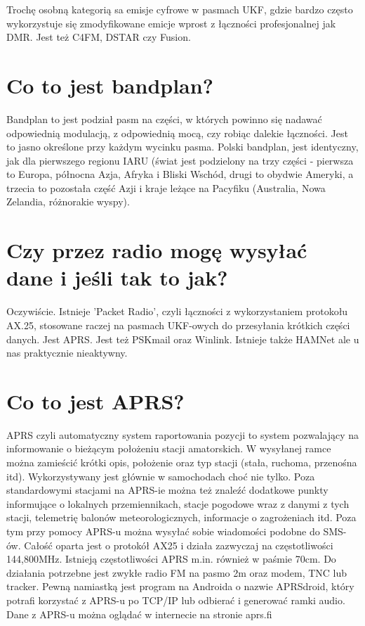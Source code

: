 \documentclass[a4paper,12pt]{article}
\begin{document}
Trochę osobną kategorią sa emisje cyfrowe w pasmach UKF, gdzie bardzo często wykorzystuje się zmodyfikowane emicje wprost z łączności profesjonalnej jak DMR. Jest też C4FM, DSTAR czy Fusion.

\section{Co to jest bandplan?}
Bandplan to jest podział pasm na części, w których powinno się nadawać odpowiednią modulacją, z odpowiednią mocą, czy robiąc dalekie łączności. Jest to jasno określone przy każdym wycinku pasma. 
Polski bandplan, jest identyczny, jak dla pierwszego regionu IARU (świat jest podzielony na trzy części - pierwsza to Europa, północna Azja, Afryka i Bliski Wschód, drugi to obydwie Ameryki, a trzecia to pozostała część Azji i kraje leżące na Pacyfiku (Australia, Nowa Zelandia, różnorakie wyspy).

\section{Czy przez radio mogę wysyłać dane i jeśli tak to jak?}
Oczywiście. Istnieje 'Packet Radio', czyli łączności z wykorzystaniem protokołu AX.25, stosowane raczej na pasmach UKF-owych do przesyłania krótkich części danych.
Jest APRS.
Jest też PSKmail oraz Winlink.
Istnieje także HAMNet ale u nas praktycznie nieaktywny.

\section{Co to jest APRS?}
APRS czyli automatyczny system raportowania pozycji to system pozwalający na informowanie o bieżącym położeniu stacji amatorskich. W wysyłanej ramce można zamieścić krótki opis, położenie oraz typ stacji (stała, ruchoma, przenośna itd). Wykorzystywany jest głównie w samochodach choć nie tylko. Poza standardowymi stacjami na APRS-ie można też znaleźć dodatkowe punkty informujące o lokalnych przemiennikach, stacje pogodowe wraz z danymi z tych stacji, telemetrię balonów meteorologicznych, informacje o zagrożeniach itd. 
Poza tym przy pomocy APRS-u można wysyłać sobie wiadomości podobne do SMS-ów.
Całość oparta jest o protokół AX25 i działa zazwyczaj na częstotliwości 144,800MHz. Istnieją częstotliwości APRS m.in. również w paśmie 70cm.
Do działania potrzebne jest zwykłe radio FM na pasmo 2m oraz modem, TNC lub tracker. 
Pewną namiastką jest program na Androida o nazwie APRSdroid, który potrafi korzystać z APRS-u po TCP/IP lub odbierać i generować ramki audio.
Dane z APRS-u można oglądać w internecie na stronie aprs.fi
\end{document}
